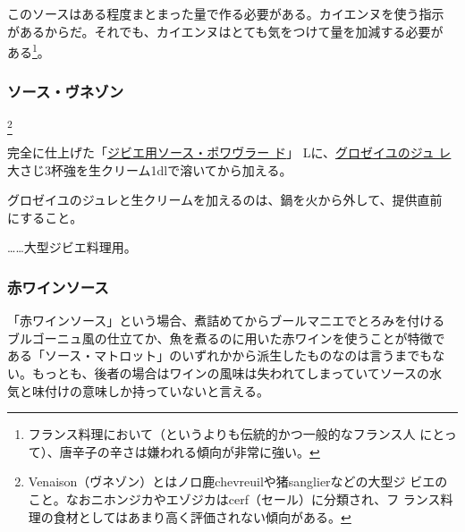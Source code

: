 \begin{recette}
このソースはある程度まとまった量で作る必要がある。カイエンヌを使う指示
があるからだ。それでも、カイエンヌはとても気をつけて量を加減する必要が
ある\footnote{フランス料理において（というよりも伝統的かつ一般的なフランス人
  にとって）、唐辛子の辛さは嫌われる傾向が非常に強い。}。

\hypertarget{sauce-venaison}{%
\subsubsection{ソース・ヴネゾン}\label{sauce-venaison}}

\footnote{Venaison（ヴネゾン）とはノロ鹿chevreuilや猪sanglierなどの大型ジ
  ビエのこと。なおニホンジカやエゾジカはcerf（セール）に分類され、フ
  ランス料理の食材としてはあまり高く評価されない傾向がある。}


完全に仕上げた「\protect\hyperlink{sauce-poivrade-pour-gibier}{ジビエ用ソース・ポワヴラー
ド}」\troisquarts{}
Lに、\protect\hyperlink{gelee-de-groseilles-a}{グロゼイユのジュ
レ}大さじ3杯強を生クリーム1dlで溶いてから加える。

グロゼイユのジュレと生クリームを加えるのは、鍋を火から外して、提供直前
にすること。

\ldots{}\ldots{}大型ジビエ料理用。

\hypertarget{sauce-vin-rouge}{%
\subsubsection{赤ワインソース}\label{sauce-vin-rouge}}



「赤ワインソース」という場合、煮詰めてからブールマニエでとろみを付ける
ブルゴーニュ風の仕立てか、魚を煮るのに用いた赤ワインを使うことが特徴で
ある「ソース・マトロット」のいずれかから派生したものなのは言うまでもな
い。もっとも、後者の場合はワインの風味は失われてしまっていてソースの水
気と味付けの意味しか持っていないと言える。


\end{recette}
